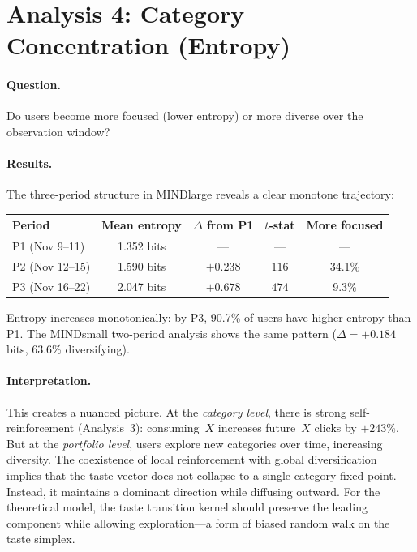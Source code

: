 \documentclass[11pt]{article}
\begin{document}
\section{Analysis 4: Category Concentration (Entropy)}

\paragraph{Question.} Do users become more focused (lower entropy) or more diverse over the observation window?

\paragraph{Results.} The three-period structure in MINDlarge reveals a clear monotone trajectory:

\begin{center}
\begin{tabular}{lcccc}
\toprule
Period & Mean entropy & $\Delta$ from P1 & $t$-stat & More focused \\
\midrule
P1 (Nov 9--11) & 1.352 bits & --- & --- & --- \\
P2 (Nov 12--15) & 1.590 bits & $+0.238$ & $116$ & 34.1\% \\
P3 (Nov 16--22) & 2.047 bits & $+0.678$ & $474$ & 9.3\% \\
\bottomrule
\end{tabular}
\end{center}

Entropy increases monotonically: by P3, 90.7\% of users have higher entropy than P1. The MINDsmall two-period analysis shows the same pattern ($\Delta = +0.184$ bits, 63.6\% diversifying).

\paragraph{Interpretation.} This creates a nuanced picture. At the \emph{category level}, there is strong self-reinforcement (Analysis~3): consuming~$X$ increases future~$X$ clicks by $+243\%$. But at the \emph{portfolio level}, users explore new categories over time, increasing diversity. The coexistence of local reinforcement with global diversification implies that the taste vector does not collapse to a single-category fixed point. Instead, it maintains a dominant direction while diffusing outward. For the theoretical model, the taste transition kernel should preserve the leading component while allowing exploration---a form of biased random walk on the taste simplex.
\end{document}
